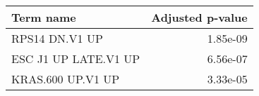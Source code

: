 \begin{tabular}{lr}
\toprule
           Term name &  Adjusted p-value \\
\midrule
      RPS14 DN.V1 UP &          1.85e-09 \\
ESC J1 UP LATE.V1 UP &          6.56e-07 \\
   KRAS.600 UP.V1 UP &          3.33e-05 \\
\bottomrule
\end{tabular}
